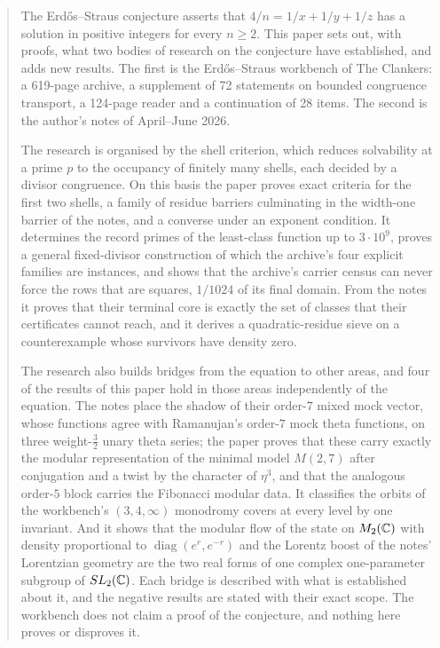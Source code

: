 \begin{abstract}
\noindent
The Erdős--Straus conjecture asserts that $4/n=1/x+1/y+1/z$ has a solution in positive integers for every $n\ge2$. This paper sets out, with proofs, what two bodies of research on the conjecture have established, and adds new results. The first is the Erdős--Straus workbench of The Clankers: a 619-page archive, a supplement of 72 statements on bounded congruence transport, a 124-page reader and a continuation of 28 items. The second is the author's notes of April--June 2026.

The research is organised by the shell criterion, which reduces solvability at a prime $p$ to the occupancy of finitely many shells, each decided by a divisor congruence. On this basis the paper proves exact criteria for the first two shells, a family of residue barriers culminating in the width-one barrier of the notes, and a converse under an exponent condition. It determines the record primes of the least-class function up to $3\cdot10^9$, proves a general fixed-divisor construction of which the archive's four explicit families are instances, and shows that the archive's carrier census can never force the rows that are squares, $1/1024$ of its final domain. From the notes it proves that their terminal core is exactly the set of classes that their certificates cannot reach, and it derives a quadratic-residue sieve on a counterexample whose survivors have density zero.

The research also builds bridges from the equation to other areas, and four of the results of this paper hold in those areas independently of the equation. The notes place the shadow of their order-$7$ mixed mock vector, whose functions agree with Ramanujan's order-$7$ mock theta functions, on three weight-$\tfrac32$ unary theta series; the paper proves that these carry exactly the modular representation of the minimal model $M(2,7)$ after conjugation and a twist by the character of $\eta^3$, and that the analogous order-$5$ block carries the Fibonacci modular data. It classifies the orbits of the workbench's $(3,4,\infty)$ monodromy covers at every level by one invariant. And it shows that the modular flow of the state on $M_2(\C)$ with density proportional to $\operatorname{diag}(e^r,e^{-r})$ and the Lorentz boost of the notes' Lorentzian geometry are the two real forms of one complex one-parameter subgroup of $SL_2(\C)$. Each bridge is described with what is established about it, and the negative results are stated with their exact scope. The workbench does not claim a proof of the conjecture, and nothing here proves or disproves it.
\end{abstract}

